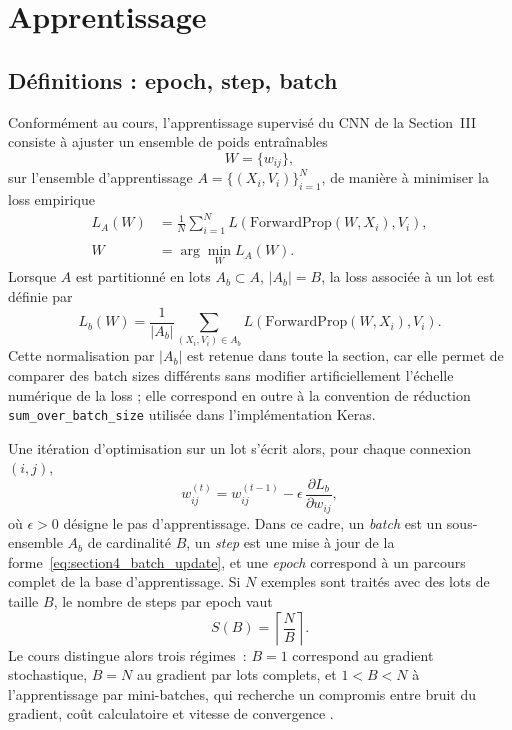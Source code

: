 \section{Apprentissage}

\subsection{D\'efinitions : epoch, step, batch}
Conform\'ement au cours, l'apprentissage supervis\'e du CNN de la Section~III consiste \`a ajuster un ensemble de poids entra\^inables
\begin{equation}
W=\{w_{ij}\},
\end{equation}
sur l'ensemble d'apprentissage $A=\{(X_i,V_i)\}_{i=1}^{N}$, de mani\`ere \`a minimiser la loss empirique
\begin{equation}
\begin{aligned}
L_A(W)
&=
\frac{1}{N}
\sum_{i=1}^{N}
L\!\left(\mathrm{ForwardProp}(W,X_i),V_i\right),\\
\widehat{W}
&=
\arg\min_{W} L_A(W).
\end{aligned}
\label{eq:section4_training_objective}
\end{equation}
Lorsque $A$ est partitionn\'e en lots $A_b\subset A$, $|A_b|=B$, la loss associ\'ee \`a un lot est d\'efinie par
\begin{equation}
L_b(W)
=
\frac{1}{|A_b|}
\sum_{(X_i,V_i)\in A_b}
L\!\left(\mathrm{ForwardProp}(W,X_i),V_i\right).
\label{eq:section4_batch_loss}
\end{equation}
Cette normalisation par $|A_b|$ est retenue dans toute la section, car elle permet de comparer des batch sizes diff\'erents sans modifier artificiellement l'\'echelle num\'erique de la loss ; elle correspond en outre \`a la convention de r\'eduction \texttt{sum\_over\_batch\_size} utilis\'ee dans l'impl\'ementation Keras.

Une it\'eration d'optimisation sur un lot s'\'ecrit alors, pour chaque connexion $(i,j)$,
\begin{equation}
w_{ij}^{(t)} = w_{ij}^{(t-1)} - \epsilon \, \frac{\partial L_b}{\partial w_{ij}},
\label{eq:section4_batch_update}
\end{equation}
o\`u $\epsilon>0$ d\'esigne le pas d'apprentissage. Dans ce cadre, un \textit{batch} est un sous-ensemble $A_b$ de cardinalit\'e $B$, un \textit{step} est une mise \`a jour de la forme~\eqref{eq:section4_batch_update}, et une \textit{epoch} correspond \`a un parcours complet de la base d'apprentissage. Si $N$ exemples sont trait\'es avec des lots de taille $B$, le nombre de steps par epoch vaut
\begin{equation}
S(B)=\left\lceil\frac{N}{B}\right\rceil.
\label{eq:section4_steps_per_epoch}
\end{equation}
Le cours distingue alors trois r\'egimes~: $B=1$ correspond au gradient stochastique, $B=N$ au gradient par lots complets, et $1<B<N$ \`a l'apprentissage par mini-batches, qui recherche un compromis entre bruit du gradient, co\^ut calculatoire et vitesse de convergence \cite{manzanera_classification_apprentissage,poly_chap4_classifml}.


